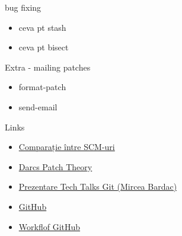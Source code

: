 \documentclass{beamer}
\begin{document}
\begin{frame}{bug fixing}
  \begin{itemize}
    \item ceva pt stash
    \item ceva pt bisect
  \end{itemize}
\end{frame}

\begin{frame}{Extra - mailing patches}
  \begin{itemize}
    \item format-patch
    \item send-email
  \end{itemize}
\end{frame}

\begin{frame}[label=l]{Links}
  \begin{itemize}
    \item \href{http://en.wikipedia.org/wiki/Comparison_of_revision_control_software}{Comparație între SCM-uri}
    \item \href{http://en.wikibooks.org/wiki/Understanding_Darcs/Patch_theory}{Darcs Patch Theory}
    \item \href{http://talks.rosedu.org/prezentari/prezentarea03}{Prezentare
    Tech Talks Git (Mircea Bardac)}
    \item \href{http://github.com}{GitHub}
    \item
    \href{http://www.eqqon.com/index.php/Collaborative_Github_Workflow}{Workflof
    GitHub}
  \end{itemize}
\end{frame}
\end{document}
